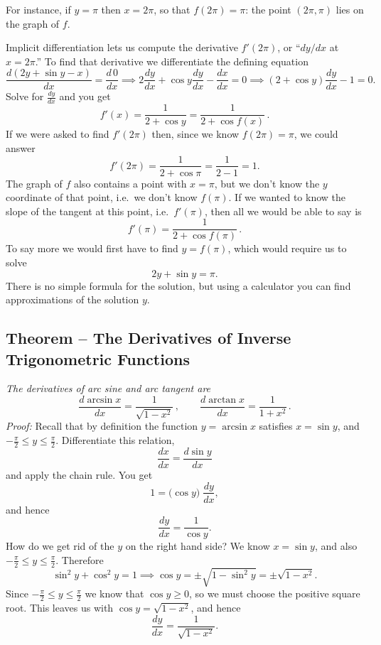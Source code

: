 For instance, if $y=\pi$ then $x=2\pi$, so that $f(2\pi) = \pi$:  the
point $(2\pi, \pi)$ lies on the graph of $f$.




Implicit differentiation lets us compute the derivative $f'(2\pi)$, or
``$dy/dx$ at $x=2\pi$.''  To find that derivative we differentiate the
defining equation
\[
\frac{d(2y+\sin y - x)}{dx} = \frac{d\,0}{dx}
\implies
2\frac{dy}{dx}+\cos y \frac{dy}{dx} - \frac{dx}{dx} = 0
\implies
(2+\cos y) \frac{dy}{dx} -1 =0.
\]%
%
Solve for $\frac{dy}{dx}$ and you get
\[
f'(x) = \frac{1}{2+\cos y} = \frac1{2+\cos f(x)}\,.
\]
If we were asked to find $f'(2\pi)$ then, since we know $f(2\pi) = \pi$, we
could answer
\[
f'(2\pi) = \frac1{2+\cos \pi} = \frac1{2-1} = 1.
\]
The graph of $f$ also contains a point with $x=\pi$, but we don't know
the $y$ coordinate of that point, i.e.~we don't know $f(\pi)$.  If we
wanted to know the slope of the tangent at this point, i.e.~$f'(\pi)$,
then all we would be able to say is
\[
f'(\pi) = \frac1{2+\cos f(\pi)}\,.
\]
To say more we would first have to find $y=f(\pi)$, which would
require us to solve
\[
2y+\sin y = \pi.
\]
There is no simple formula for the solution, but using a calculator
you can find approximations of the solution $y$.




\subsection{Theorem -- The Derivatives of Inverse Trigonometric Functions} 
\textit{ The derivatives of arc sine and arc tangent are }
\[
  \frac{d\arcsin x}{dx} = \frac 1{\sqrt{1-x^2}}\,, \qquad
  \frac{d\arctan x}{dx} = \frac 1{1+x^2}\,.
\]
\textit{Proof: } Recall that by definition the function $y =\arcsin x$
satisfies $x=\sin y$, and $-\frac\pi2 \leq y \leq \frac\pi2$.
Differentiate this relation,
\[
\frac{dx}{dx} = \frac{d\sin y}{dx}
\]
and apply the chain rule.  You get
\[
1 = \bigl(\cos y\bigr)\; \frac{dy}{dx},
\]
and hence
\[
\frac{dy}{dx} = \frac1{\cos y}.
\]
How do we get rid of the $y$ on the right hand side? We know $x=\sin
y$, and also $-\frac\pi2\leq y \leq \frac\pi2$.  Therefore
\[
\sin^2 y + \cos^2 y = 1 \implies \cos y = \pm\sqrt{1-\sin^2y} =
\pm\sqrt{1-x^2}.
\]
Since $-\frac\pi2\leq y \leq \frac\pi2$ we know that $\cos y\geq 0$,
so we must choose the positive square root.  This leaves us with $\cos
y = \sqrt{1-x^2}$, and hence
\[
\frac{dy}{dx} = \frac1{\sqrt{1-x^2}}.
\]




